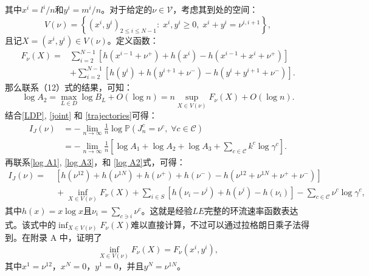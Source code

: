 其中$x^i = l^i/n$和$y^i = m^i/n$。对于给定的$\nu \in \mathcal{V}$，考虑其到处的空间：
\begin{equation*}
    V(\nu) = \left\{\left(x^{i},y^{i}\right)_{2\le i\le N-1}:\;x^i,y^i\geq0,\;x^{i}+y^{i}=\nu^{i,i+1}\right\},
\end{equation*}
且记$X = (x^i, y^i) \in V(\nu)$。定义函数：
\begin{equation}\label{formula:F}
    \begin{split}
    F_{\nu}(X)
    =&\sum_{i=2}^{N-1}\left[ h\left(x^{i-1}+\nu^+\right) + h\left(x^{i}\right) - h\left(x^{i-1}+x^{i}+\nu^+\right) \right] \\
    &+ \sum_{i=2}^{N-1} \left[h\left(y^{i}\right) + h\left(y^{i+1} +\nu^-\right)-h\left(y^{i} +y^{i+1} +\nu^-\right)\right].
    \end{split}
\end{equation}
那么联系（12）式的结果，可知：
\begin{equation}\label{log A2}
    \log A_2 = \max_{L\in D}\log B_L+O(\log n)
    = n\sup_{X\in V(\nu)}F_{\nu}(X)+O(\log n).
\end{equation}
结合\eqref{LDP}, \eqref{joint} 和 \eqref{trajectories}可得：
\begin{equation*}
    \begin{split}
    I_J(\nu) &= -\lim_{n\to\infty}\frac{1}{n}\log\mathbb{P}\left(J^c_n=\nu^c,\;\forall c\in\mathcal{C}\right)\\
    &= -\lim_{n\to\infty}\frac{1}{n}\left[\log A_1+\log A_2+\log A_3+\sum_{c\in\mathcal{C}}k^c\log\gamma^c\right].
    \end{split}
\end{equation*}
再联系\eqref{log A1}, \eqref{log A3}，和 \eqref{log A2}式，可得：
\begin{equation}\label{ratefunction}
    \begin{split}
    I_J(\nu) =&\; \left[h\left(\nu^{12}\right)+h\left(\nu^{1N}\right)
    +h\left(\nu^+\right)+h\left(\nu^-\right)-h\left(\nu^{12}+\nu^{1N}+\nu^++\nu^-\right)\right] \\
    &\;+\inf_{X\in V(\nu)}F_{\nu}(X)+\sum_{i\in S}\left[ h\left(\nu_i-\nu^i\right)+h\left(\nu^i\right)
    -h\left(\nu_i\right)\right]-\sum_{c\in\mathcal{C}}\nu^c\log\gamma^c,
    \end{split}
\end{equation}
其中$h(x) = x \log x$且$\nu_i=\sum_{c\ni i}\nu^c$。这就是经验$LE$完整的环流速率函数表达式。该式中的$\inf_{X\in V(\nu)}F_{\nu}(X)$难以直接计算，不过可以通过拉格朗日乘子法得到。在附录 A 中，证明了
\begin{equation*}
    \inf_{X\in V(\nu)}F_{\nu}(X) = F_{\nu}(x^i,y^i),
\end{equation*}
其中$x^1=\nu^{12}$，$x^N=0$，$y^1=0$，并且$y^N=\nu^{1N}$。

